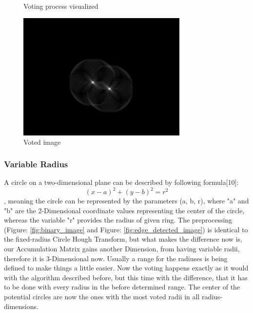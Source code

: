 \begin{figure}[H]
	\caption{Voting process visualized\cite{hough2}}\label{fig:circlehough_explanation}
	\endminipage
	\hfill
	\includegraphics[width=\linewidth]{images/hough_circle.jpg}
	\caption{Voted image \cite{hough3}}\label{fig:voted_image}
	\endminipage
\end{figure}

\subsubsection{Variable Radius}
A circle on a two-dimensional plane can be described by following formula[10]: \[ (x - a)^2 + (y - b)^2 = r^2  \]
, meaning the circle can be represented by the parameters (a, b, r), where "a" and "b" are the 2-Dimensional coordinate values representing the center of the circle, whereas the variable "r" provides the radius of given ring. \newline
The preprocessing (Figure: \ref{fig:binary_image} and Figure: \ref{fig:edge_detected_image}) is identical to the fixed-radius Circle Hough Transform, but what makes the difference now is, our Accumulation Matrix gains another Dimension, from having variable radii, therefore it is 3-Dimensional now. Usually a range for the radiuses is being defined to make things a little easier. Now the voting happens exactly as it would with the algorithm described before, but this time with the difference, that it has to be done with every radius in the before determined range. The center of the potential circles are now the ones with the most voted radii in all radius-dimensions.

